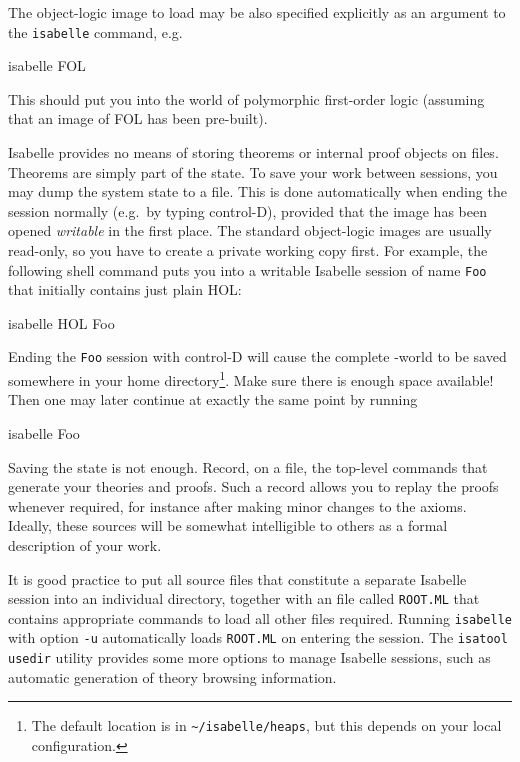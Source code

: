\medskip

The object-logic image to load may be also specified explicitly as an argument
to the {\tt isabelle} command, e.g.
\begin{ttbox}
isabelle FOL
\end{ttbox}
This should put you into the world of polymorphic first-order logic (assuming
that an image of FOL has been pre-built).

 Isabelle provides no means of storing
theorems or internal proof objects on files.  Theorems are simply part of the
\ML{} state.  To save your work between sessions, you may dump the \ML{}
system state to a file.  This is done automatically when ending the session
normally (e.g.\ by typing control-D), provided that the image has been opened
\emph{writable} in the first place.  The standard object-logic images are
usually read-only, so you have to create a private working copy first.  For
example, the following shell command puts you into a writable Isabelle session
of name \texttt{Foo} that initially contains just plain HOL:
\begin{ttbox}
isabelle HOL Foo
\end{ttbox}
Ending the \texttt{Foo} session with control-D will cause the complete
\ML-world to be saved somewhere in your home directory\footnote{The default
  location is in \texttt{\~\relax/isabelle/heaps}, but this depends on your
  local configuration.}.  Make sure there is enough space available! Then one
may later continue at exactly the same point by running
\begin{ttbox}
isabelle Foo  
\end{ttbox}

\medskip Saving the {\ML} state is not enough.  Record, on a file, the
top-level commands that generate your theories and proofs.  Such a record
allows you to replay the proofs whenever required, for instance after making
minor changes to the axioms.  Ideally, these sources will be somewhat
intelligible to others as a formal description of your work.

It is good practice to put all source files that constitute a separate
Isabelle session into an individual directory, together with an {\ML} file
called \texttt{ROOT.ML} that contains appropriate commands to load all other
files required.  Running \texttt{isabelle} with option \texttt{-u}
automatically loads \texttt{ROOT.ML} on entering the session.  The
\texttt{isatool usedir} utility provides some more options to manage Isabelle
sessions, such as automatic generation of theory browsing information.

